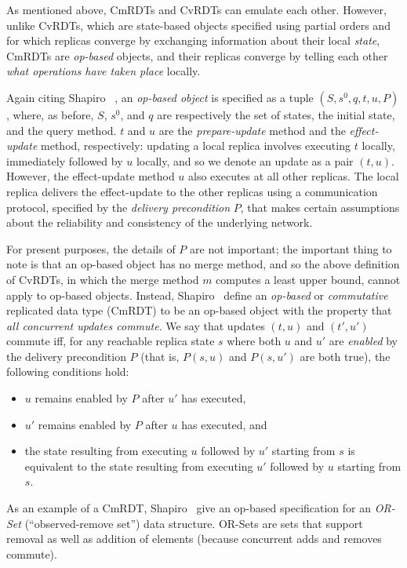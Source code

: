 \documentclass{article}
\begin{document}
As mentioned above, CmRDTs and CvRDTs can emulate each other.
However, unlike CvRDTs, which are state-based objects specified using
partial orders and for which replicas converge by exchanging
information about their local \emph{state}, CmRDTs are \emph{op-based}
objects, and their replicas converge by telling each other \emph{what
  operations have taken place} locally.

Again citing Shapiro \etal~\cite{crdts, crdts-tr}, an \emph{op-based
  object} is specified as a tuple $(S, s^0, q, t, u, P)$, where, as
before, $S$, $s^0$, and $q$ are respectively the set of states, the
initial state, and the query method. $t$ and $u$ are the
\emph{prepare-update} method and the \emph{effect-update} method,
respectively: updating a local replica involves executing $t$ locally,
immediately followed by $u$ locally, and so we denote an update as a
pair $(t, u)$.  However, the effect-update method $u$ also executes at
all other replicas.  The local replica delivers the effect-update to
the other replicas using a communication protocol, specified by the
\emph{delivery precondition} $P$, that makes certain assumptions about
the reliability and consistency of the underlying network.

For present purposes, the details of $P$ are not important; the
important thing to note is that an op-based object has no merge
method, and so the above definition of CvRDTs, in which the merge
method $m$ computes a least upper bound, cannot apply to op-based
objects.  Instead, Shapiro \etal~define an \emph{op-based} or
\emph{commutative} replicated data type (CmRDT) to be an op-based
object with the property that \emph{all concurrent updates commute}.
We say that updates $(t, u)$ and $(t', u')$ commute iff, for any
reachable replica state $s$ where both $u$ and $u'$ are \emph{enabled}
by the delivery precondition $P$ (that is, $P(s, u)$ and $P(s, u')$
are both true), the following conditions hold:
\begin{itemize}
  \item $u$ remains enabled by $P$ after $u'$ has executed,
  \item $u'$ remains enabled by $P$ after $u$ has executed, and
  \item the state resulting from executing $u$ followed by $u'$
    starting from $s$ is equivalent to the state resulting from
    executing $u'$ followed by $u$ starting from $s$.
\end{itemize}
As an example of a CmRDT, Shapiro \etal~give an op-based specification
for an \emph{OR-Set} (``observed-remove set'') data structure.
OR-Sets are sets that support removal as well as addition of elements
(because concurrent adds and removes commute).
\end{document}
